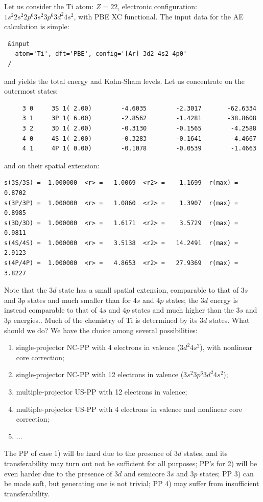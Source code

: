 \documentclass[12pt,a4paper]{article}
\begin{document}
Let us consider the Ti atom: $Z=22$, electronic configuration: 
$1s^2 2s^2 2p^6 3s^2 3p^6 3d^2 4s^2$, with PBE XC functional.
The input data for the AE calculation is simple:
\begin{verbatim}
 &input
   atom='Ti', dft='PBE', config='[Ar] 3d2 4s2 4p0'
 /
\end{verbatim}
and yields the total energy and Kohn-Sham levels. Let us concentrate
on the outermost states:
\begin{verbatim}
     3 0     3S 1( 2.00)        -4.6035        -2.3017       -62.6334
     3 1     3P 1( 6.00)        -2.8562        -1.4281       -38.8608
     3 2     3D 1( 2.00)        -0.3130        -0.1565        -4.2588
     4 0     4S 1( 2.00)        -0.3283        -0.1641        -4.4667
     4 1     4P 1( 0.00)        -0.1078        -0.0539        -1.4663
\end{verbatim}
and on their spatial extension:
\begin{verbatim}
s(3S/3S) =  1.000000  <r> =   1.0069  <r2> =    1.1699  r(max) =   0.8702
s(3P/3P) =  1.000000  <r> =   1.0860  <r2> =    1.3907  r(max) =   0.8985
s(3D/3D) =  1.000000  <r> =   1.6171  <r2> =    3.5729  r(max) =   0.9811
s(4S/4S) =  1.000000  <r> =   3.5138  <r2> =   14.2491  r(max) =   2.9123
s(4P/4P) =  1.000000  <r> =   4.8653  <r2> =   27.9369  r(max) =   3.8227
\end{verbatim}
Note that the $3d$ state has a small spatial extension, comparable to that of
$3s$ and $3p$ states and much smaller than for $4s$ and $4p$ states; the
$3d$ energy is instead comparable to that of $4s$ and $4p$ states and much
higher than the $3s$ and $3p$ energies.. Much of the chemistry of Ti is 
determined by its $3d$ states. What should we do? We have the choice among 
several possibilities:
\begin{enumerate}
\item single-projector NC-PP with 4 electrons in valence ($3d^2 4s^2$),
with nonlinear core correction;
\item single-projector NC-PP with 12 electrons in valence 
($3s^2 3p^6 3d^2 4s^2$);
\item multiple-projector US-PP with 12 electrons in valence;
\item multiple-projector US-PP with 4 electrons in valence and 
      nonlinear core correction;
\item ...
\end{enumerate}
The PP of case 1) will be hard due to the presence of $3d$ states, and 
its transferability may turn out not be sufficient for all purposes;
PP's for 2) will be even harder due to the presence of $3d$ and
semicore $3s$ and $3p$ states; PP 3) can be made soft, but generating
one is not trivial; PP 4) may suffer from insufficient transferability.
\end{document}
